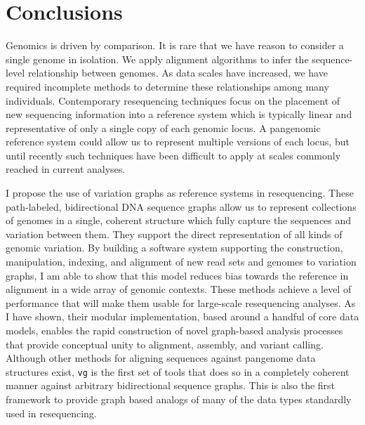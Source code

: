 %
\chapter{Conclusions}

\ifpdf
    \graphicspath{{Chapter3/Figs/Raster/}{Chapter3/Figs/PDF/}{Chapter3/Figs/}}
\else
    \graphicspath{{Chapter3/Figs/Vector/}{Chapter3/Figs/}}
\fi

Genomics is driven by comparison.
It is rare that we have reason to consider a single genome in isolation.
We apply alignment algorithms to infer the sequence-level relationship between genomes.
As data scales have increased, we have required incomplete methods to determine these relationships among many individuals.
Contemporary resequencing techniques focus on the placement of new sequencing information into a reference system which is typically linear and representative of only a single copy of each genomic locus.
A pangenomic reference system could allow us to represent multiple versions of each locus, but until recently such techniques have been difficult to apply at scales commonly reached in current analyses.

I propose the use of variation graphs as reference systems in resequencing.
These path-labeled, bidirectional DNA sequence graphs allow us to represent collections of genomes in a single, coherent structure which fully capture the sequences and variation between them.
They support the direct representation of all kinds of genomic variation.
By building a software system supporting the construction, manipulation, indexing, and alignment of new read sets and genomes to variation graphs, I am able to show that this model reduces bias towards the reference in alignment in a wide array of genomic contexts.
These methods achieve a level of performance that will make them usable for large-scale resequencing analyses.
As I have shown, their modular implementation, based around a handful of core data models, enables the rapid construction of novel graph-based analysis processes that provide conceptual unity to alignment, assembly, and variant calling.
Although other methods for aligning sequences against pangenome data structures exist, {\tt vg} is the first set of tools that does so in a completely coherent manner against arbitrary bidirectional sequence graphs.
This is also the first framework to provide graph based analogs of many of the data types standardly used in resequencing.


